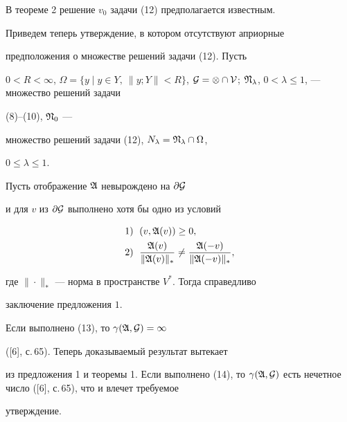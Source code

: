 В теореме 2 решение $v_0$ задачи (12) предполагается известным. 


Приведем теперь утверждение, в котором отсутствуют априорные 


предположения о множестве решений задачи (12). Пусть 


$0<R<\infty$, $\Omega=\{y\mid y\in Y,\ \|y;Y\|<R\}$, $\cal G=\Omega\cap 


V$; $\frak N_\lambda$, $0<\lambda\le1$, --- множество решений задачи 


(8)--(10), $\frak N_0$ --- 


множество решений задачи (12), $N_\lambda=\frak N_\lambda\cap\Omega$, 


$0\le\lambda\le1$. 


 


\begin{thm} 


Пусть отображение $\frak A$ невырождено на $\partial\cal G$ 


и для $v$ из $\partial\cal G$ выполнено хотя бы одно из условий 


\begin{align} 


1&)\ \; (v,\frak A(v))\ge0,\\ 


2&)\ \; \frac{\frak A(v)}{\|\frak A(v)\|_*}\ne 


\frac{\frak A(-v)}{\|\frak A(-v)\|_*}, 


\end{align} 


где $\|\cdot\|_*$ --- норма в пространстве $V^*$. Тогда справедливо 


заключение предложения $1$. 


\end{thm} 


 


\begin{pf} 


Если выполнено (13), то $\gamma(\frak A,\cal G)=1$ 


([6], с.\,65). Теперь доказываемый результат вытекает 


из предложения 1 и теоремы 1. Если выполнено (14), то $\gamma(\frak 


A,\cal G)$ есть нечетное число ([6], с.\,65), что и влечет требуемое 


утверждение. 


\end{pf} 


